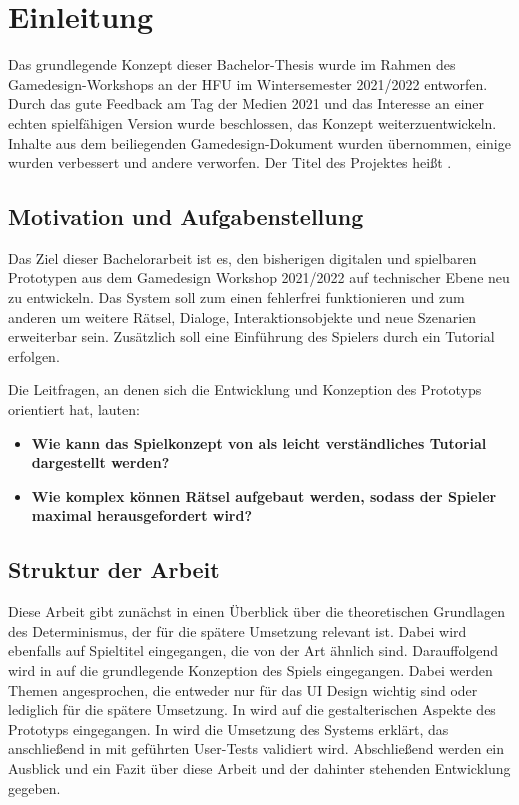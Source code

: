 \chapter{Einleitung}\label{sec:intro}
Das grundlegende Konzept dieser Bachelor-Thesis wurde im Rahmen des Gamedesign-Workshops an der \ac{HFU} im Wintersemester 2021/2022 entworfen.
Durch das gute Feedback am Tag der Medien 2021 und das Interesse an einer echten spielfähigen Version wurde beschlossen, das Konzept weiterzuentwickeln. 
Inhalte aus dem beiliegenden Gamedesign-Dokument wurden übernommen, einige wurden verbessert und andere verworfen. 
Der Titel des Projektes heißt .


\section{Motivation und Aufgabenstellung}
Das Ziel dieser Bachelorarbeit ist es, den bisherigen digitalen und spielbaren Prototypen aus dem Gamedesign Workshop 2021/2022 auf technischer Ebene neu zu entwickeln. Das System soll zum einen fehlerfrei funktionieren und zum anderen um weitere Rätsel, Dialoge, Interaktionsobjekte und neue Szenarien erweiterbar sein. Zusätzlich soll eine Einführung des Spielers durch ein Tutorial erfolgen. 


Die Leitfragen, an denen sich die Entwicklung und Konzeption des Prototyps orientiert hat, lauten:
\begin{itemize}  
    \item \textbf{Wie kann das Spielkonzept von  \emph{} als leicht verständliches Tutorial dargestellt werden?}
    \item \textbf{Wie komplex können Rätsel aufgebaut werden, sodass der Spieler maximal herausgefordert wird?}
\end{itemize}

\section{Struktur der Arbeit}
Diese Arbeit gibt zunächst in  einen Überblick über die theoretischen Grundlagen des Determinismus, der für die spätere Umsetzung relevant ist. Dabei wird ebenfalls auf Spieltitel eingegangen, die von der Art ähnlich sind. Darauffolgend wird in  auf die grundlegende Konzeption des Spiels eingegangen. Dabei werden Themen angesprochen, die entweder nur für das \ac{UI} Design wichtig sind oder lediglich für die spätere Umsetzung. In  wird auf die gestalterischen Aspekte des Prototyps eingegangen. In  wird die Umsetzung des Systems erklärt, das anschließend in  mit geführten User-Tests validiert wird. Abschließend werden ein Ausblick und ein Fazit über diese Arbeit und der dahinter stehenden Entwicklung gegeben.
